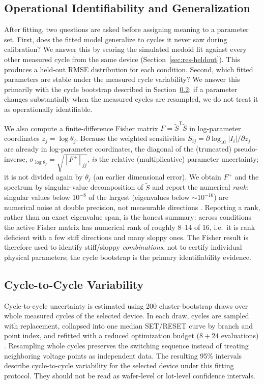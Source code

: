 \documentclass[journal]{IEEEtran}
\begin{document}
\subsection{Operational Identifiability and Generalization}
\label{sec:ident}

After fitting, two questions are asked before assigning meaning to a
parameter set.  First, does the fitted model generalize to cycles it never
saw during calibration?  We answer this by scoring the simulated medoid fit
against every other measured cycle from the same device
(Section~\ref{sec:res-heldout}).  This produces a held-out RMSE distribution
for each condition.  Second, which fitted parameters are stable under the
measured cycle variability?  We answer this primarily with the cycle
bootstrap described in Section~\ref{sec:boot}: if a parameter changes
substantially when the measured cycles are resampled, we do not treat it as
operationally identifiable.

We also compute a finite-difference Fisher matrix
$F=\widetilde S^{\mathsf T}\widetilde S$ in log-parameter coordinates
$z_j=\log\theta_j$.  Because the weighted sensitivities
$\widetilde S_{ij}=\partial\log_{10}|I_i|/\partial z_j$ are already in
log-parameter coordinates, the diagonal of the (truncated) pseudo-inverse,
$\sigma_{\log\theta_j}=\sqrt{[F^+]_{jj}}$, \emph{is} the relative (multiplicative)
parameter uncertainty; it is not divided again by $\theta_j$ (an earlier
dimensional error).  We obtain $F^+$ and the spectrum by singular-value
decomposition of $\widetilde S$ and report the numerical \emph{rank}: singular
values below $10^{-8}$ of the largest (eigenvalues below $\sim10^{-16}$) are
numerical noise at double precision, not measurable directions
\cite{raue2009,transtrum2015sloppiness}.  Reporting a rank, rather than an
exact eigenvalue span, is the honest summary: across conditions the active
Fisher matrix has numerical rank of roughly $8$--$14$ of $16$, i.e.\ it is rank
deficient with a few stiff directions and many sloppy ones.  The Fisher result
is therefore used to identify stiff/sloppy \emph{combinations}, not to certify
individual physical parameters; the cycle bootstrap is the primary
identifiability evidence.

\subsection{Cycle-to-Cycle Variability}
\label{sec:boot}

Cycle-to-cycle uncertainty is estimated using 200 cluster-bootstrap draws
over whole measured cycles of the selected device.  In each draw, cycles are
sampled with replacement, collapsed into one median SET/RESET curve by branch
and point index, and refitted with a reduced optimization budget ($8+24$
evaluations) \cite{efron1994bootstrap}.  Resampling whole cycles preserves
the switching sequence instead of treating neighboring voltage points as
independent data.  The resulting 95\% intervals describe cycle-to-cycle
variability for the selected device under this fitting protocol.  They should
not be read as wafer-level or lot-level confidence intervals.
\end{document}
